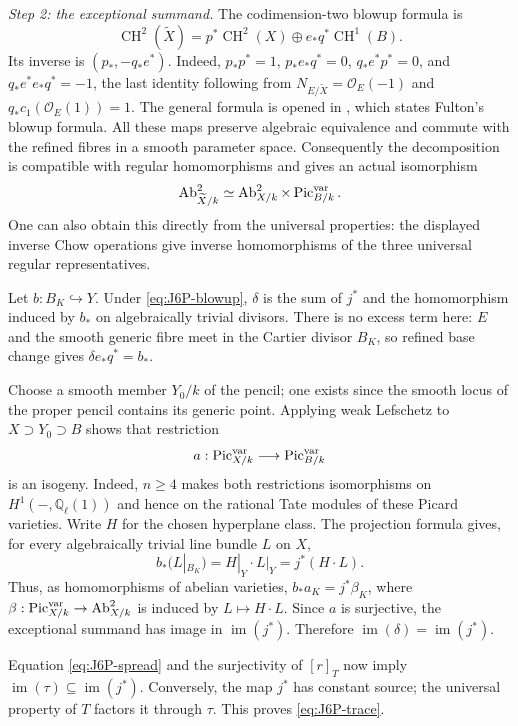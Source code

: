\emph{Step 2: the exceptional summand.}
The codimension-two blowup formula is
\[
 \operatorname{CH}^2(\widetilde X)
 =p^*\operatorname{CH}^2(X)\oplus e_*q^*\operatorname{CH}^1(B).
\]
Its inverse is $(p_*,-q_*e^*)$. Indeed,
$p_*p^*=1$, $p_*e_*q^*=0$, $q_*e^*p^*=0$, and
$q_*e^*e_*q^*=-1$, the last identity following from
$N_{E/\widetilde X}=\mathcal O_E(-1)$ and
$q_*c_1(\mathcal O_E(1))=1$. The general formula is opened in
\cite[Section 2.3, Theorem 2.8(3)]{DGJ_Jiang2023}, which states
Fulton's blowup formula. All these maps preserve algebraic
equivalence and commute with the refined fibres in a smooth
parameter space. Consequently the decomposition is compatible
with regular homomorphisms and gives an actual isomorphism
\begin{equation}\label{eq:J6P-blowup}
 \operatorname{Ab}^2_{\widetilde X/k}
 \simeq\operatorname{Ab}^2_{X/k}\times\operatorname{Pic}^{\rm var}_{B/k}.
\end{equation}
One can also obtain this directly from the universal properties:
the displayed inverse Chow operations give inverse homomorphisms
of the three universal regular representatives.

Let $b:B_K\hookrightarrow Y$. Under
\eqref{eq:J6P-blowup}, $\delta$ is the sum of $j^*$ and the
homomorphism induced by $b_*$ on algebraically trivial divisors.
There is no excess term here: $E$ and the smooth generic fibre
meet in the Cartier divisor $B_K$, so refined base change gives
$\delta e_*q^*=b_*$.

Choose a smooth member $Y_0/k$ of the pencil; one exists since
the smooth locus of the proper pencil contains its generic point.
Applying weak Lefschetz to $X\supset Y_0\supset B$ shows that
restriction
\[
 a:\operatorname{Pic}^{\rm var}_{X/k}
       \longrightarrow\operatorname{Pic}^{\rm var}_{B/k}
\]
is an isogeny. Indeed, $n\geq4$ makes both restrictions
isomorphisms on $H^1(-,\mathbb Q_\ell(1))$ and hence on the
rational Tate modules of these Picard varieties. Write $H$ for
the chosen hyperplane class. The projection formula gives,
for every algebraically trivial line bundle $L$ on $X$,
\[
 b_*(L|_{B_K})=H|_Y\cdot L|_Y=j^*(H\cdot L).
\]
Thus, as homomorphisms of abelian varieties,
$b_*a_K=j^*\beta_K$, where
$\beta:\operatorname{Pic}^{\rm var}_{X/k}\to
\operatorname{Ab}^2_{X/k}$ is induced by $L\mapsto H\cdot L$.
Since $a$ is surjective, the exceptional summand has image in
$\operatorname{im}(j^*)$. Therefore
$\operatorname{im}(\delta)=\operatorname{im}(j^*)$.

Equation \eqref{eq:J6P-spread} and the surjectivity of $[r]_T$
now imply $\operatorname{im}(\tau)\subseteq\operatorname{im}(j^*)$.
Conversely, the map $j^*$ has constant source; the universal
property of $T$ factors it through $\tau$. This proves
\eqref{eq:J6P-trace}.

